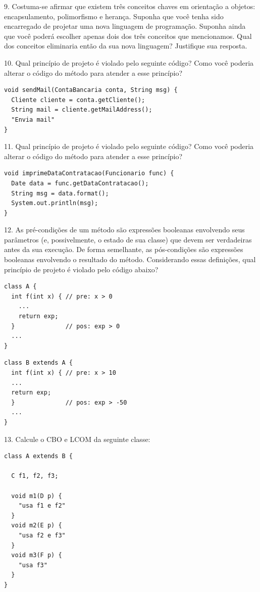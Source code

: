 \documentclass[
  11pt,
  twoside]{book}
\begin{document}
9. Costuma-se afirmar que existem três conceitos chaves em orientação a
objetos: encapsulamento, polimorfismo e herança. Suponha que você tenha
sido encarregado de projetar uma nova linguagem de programação. Suponha
ainda que você poderá escolher apenas dois dos três conceitos que
mencionamos. Qual dos conceitos eliminaria então da sua nova linguagem?
Justifique sua resposta.

10. Qual princípio de projeto é violado pelo seguinte código? Como você
poderia alterar o código do método para atender a esse princípio?

\begin{lstlisting}
void sendMail(ContaBancaria conta, String msg) {
  Cliente cliente = conta.getCliente();
  String mail = cliente.getMailAddress();
  "Envia mail"
}  
\end{lstlisting}

11. Qual princípio de projeto é violado pelo seguinte código? Como você
poderia alterar o código do método para atender a esse princípio?

\begin{lstlisting}
void imprimeDataContratacao(Funcionario func) {
  Date data = func.getDataContratacao();
  String msg = data.format();
  System.out.println(msg);
}  
\end{lstlisting}

12. As pré-condições de um método são expressões booleanas envolvendo
seus parâmetros (e, possivelmente, o estado de sua classe) que devem ser
verdadeiras antes da sua execução. De forma semelhante, as pós-condições
são expressões booleanas envolvendo o resultado do método. Considerando
essas definições, qual princípio de projeto é violado pelo código
abaixo?

\begin{lstlisting}
class A {  
  int f(int x) { // pre: x > 0
    ...
    return exp;
  }              // pos: exp > 0
  ...
}
\end{lstlisting}

\begin{lstlisting}
class B extends A {  
  int f(int x) { // pre: x > 10
  ...
  return exp;
  }              // pos: exp > -50
  ...
}
\end{lstlisting}

13. Calcule o CBO e LCOM da seguinte classe:

\begin{lstlisting}
class A extends B {

  C f1, f2, f3;

  void m1(D p) {
    "usa f1 e f2"
  }
  void m2(E p) {
    "usa f2 e f3"
  }
  void m3(F p) {
    "usa f3"  
  }
}
\end{lstlisting}
\end{document}
